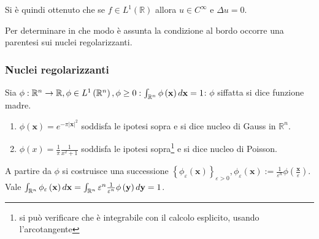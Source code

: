 \documentclass{article}
\begin{document}
Si \`{e} quindi ottenuto che se $f\in L^{1}\left( 
\mathbb{R}
\right) $ allora $u\in C^{\infty }$ e $\Delta u=0$.

Per determinare in che modo \`{e} assunta la condizione al bordo occorre una
parentesi sui nuclei regolarizzanti.

\subsubsection{Nuclei regolarizzanti}

Sia $\phi :%
\mathbb{R}
^{n}\rightarrow 
\mathbb{R}
,\phi \in L^{1}\left( 
\mathbb{R}
^{n}\right) ,\phi \geq 0:\int_{%
\mathbb{R}
^{n}}\phi \left( \mathbf{x}\right) d\mathbf{x}=1$: $\phi $ siffatta si dice
funzione madre.

\begin{enumerate}
\item $\phi \left( \mathbf{x}\right) =e^{-\pi \left\vert \mathbf{x}%
\right\vert ^{2}}$ soddisfa le ipotesi sopra e si dice nucleo di Gauss in $%
\mathbb{R}
^{n}$.

\item $\phi \left( x\right) =\frac{1}{\pi }\frac{1}{x^{2}+1}$ soddisfa le
ipotesi sopra\footnote{%
si pu\`{o} verificare che \`{e} integrabile con il calcolo esplicito, usando
l'arcotangente} e si dice nucleo di Poisson.
\end{enumerate}

A partire da $\phi $ si costruisce una successione $\left\{ \phi
_{\varepsilon }\left( \mathbf{x}\right) \right\} _{\varepsilon >0},\phi
_{\varepsilon }\left( \mathbf{x}\right) :=\frac{1}{\varepsilon ^{n}}\phi
\left( \frac{\mathbf{x}}{\varepsilon }\right) $. Vale $\int_{%
\mathbb{R}
^{n}}\phi _{\varepsilon }\left( \mathbf{x}\right) d\mathbf{x}=\int_{%
\mathbb{R}
^{n}}\varepsilon ^{n}\frac{1}{\varepsilon ^{n}}\phi \left( \mathbf{y}\right)
d\mathbf{y}=1$.
\end{document}
